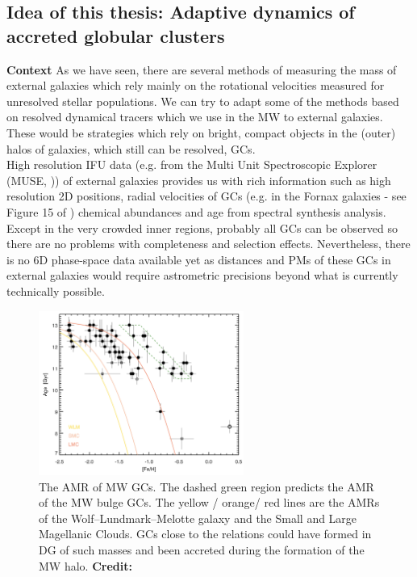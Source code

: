 \subsection{Idea of this thesis: Adaptive dynamics of accreted globular clusters}
\textbf{Context}
As we have seen, there are several methods of measuring the mass of external galaxies which rely mainly on the rotational velocities measured for unresolved stellar populations. We can try to adapt some of the methods based on resolved dynamical tracers which we use in the \ac{MW} to external galaxies. These would be strategies which rely on bright, compact objects in the (outer) halos of galaxies, which still can be resolved, \acp{GC}. 
\\
High resolution \ac{IFU} data (e.g. from the Multi Unit Spectroscopic Explorer (MUSE, \citealp{Bacon...MUSE...2010})) of external galaxies provides us with rich information such as high resolution 2D positions, radial velocities of \acp{GC} (e.g. in the Fornax galaxies - see Figure 15 of \citealp{Sarzi...Fornax3d....2018}) chemical abundances and age from spectral synthesis analysis. Except in the very crowded inner regions, probably all \acp{GC} can be observed so there are no problems with completeness and selection effects. Nevertheless, there is no 6D phase-space data available yet as distances and \acp{PM} of these \acp{GC} in external galaxies would require astrometric precisions beyond what is currently technically possible. 
\begin{figure}
    \captionsetup{format=plain}
    \centering
    \includegraphics[width=0.6\textwidth]{plots/Intro/Leaman_GCmetal.png}
    \caption{The \ac{AMR} of \ac{MW} \acp{GC}. The dashed green region predicts the \ac{AMR} of the \ac{MW} bulge \acp{GC}. The yellow / orange/ red lines are the \acp{AMR} of the Wolf–Lundmark–Melotte galaxy and the Small and Large Magellanic Clouds. \acp{GC} close to the relations could have formed in \ac{DG} of such masses and been accreted during the formation of the \ac{MW} halo. \textbf{Credit:} \citet{Leaman...agemetall.MWGCs...2013}}
    \label{fig:GC_metal_distinguish}
    
\end{figure}
